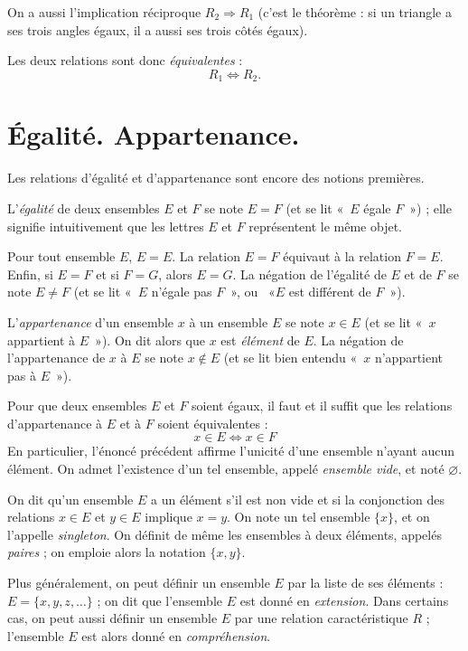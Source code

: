 \documentclass[12pt,parskip=full,chapterprefix=true,a5paper]{scrbook}
\begin{document}
On a aussi l'implication réciproque \(R_2\Rightarrow R_1\) (c'est le théorème : si un triangle a ses trois angles égaux, il a aussi ses trois côtés égaux).

Les deux relations sont donc \emph{équivalentes} :
\[R_1\Leftrightarrow R_2.\]

\section{Égalité. Appartenance.}

Les relations d'égalité et d'appartenance sont encore des notions premières.

L'\emph{égalité} de deux ensembles \(E\) et \(F\) se note \(E=F\) (et se lit «~\(E\) égale \(F\)~») ; elle signifie intuitivement que les lettres \(E\) et \(F\) représentent le même objet.

Pour tout ensemble \(E\), \(E=E\). La relation \(E=F\) équivaut à la relation \(F=E\). Enfin, si \(E=F\) et si \(F=G\), alors \(E=G\). La négation de l'égalité de \(E\) et de \(F\) se note \(E\neq F\) (et se lit «~\(E\) n'égale pas \(F\)~», ou ~«\(E\) est différent de \(F\)~»).

L'\emph{appartenance} d'un ensemble \(x\) à un ensemble \(E\) se note \(x\in E\) (et se lit «~\(x\) appartient à \(E\)~»). On dit alors que \(x\) est \emph{élément} de \(E\). La négation de l'appartenance de \(x\) à \(E\) se note \(x\notin E\) (et se lit bien entendu «~\(x\) n'appartient pas à \(E\)~»).

Pour que deux ensembles \(E\) et \(F\) soient égaux, il faut et il suffit que les relations d'appartenance à \(E\) et à \(F\) soient équivalentes :
\[
  x\in E \Leftrightarrow x\in F
\]
En particulier, l'énoncé précédent affirme l'unicité d'une ensemble n'ayant aucun élément. On admet l'existence d'un tel ensemble, appelé \emph{ensemble vide}, et noté \(\varnothing\).

On dit qu'un ensemble \(E\) a un élément s'il est non vide et si la conjonction des relations \(x\in E\) et \(y\in E\) implique \(x=y\). On note un tel ensemble \(\{x\}\), et on l'appelle \emph{singleton}. On définit de même les ensembles à deux éléments, appelés \emph{paires} ; on emploie alors la notation \(\{x,y\}\).

Plus généralement, on peut définir un ensemble \(E\) par la liste de ses éléments : \(E=\{x,y,z,\dots\}\) ; on dit que l'ensemble \(E\) est donné en \emph{extension}. Dans certains cas, on peut aussi définir un ensemble \(E\) par une relation caractéristique \(R\) ; l'ensemble \(E\) est alors donné en \emph{compréhension}.
\end{document}
